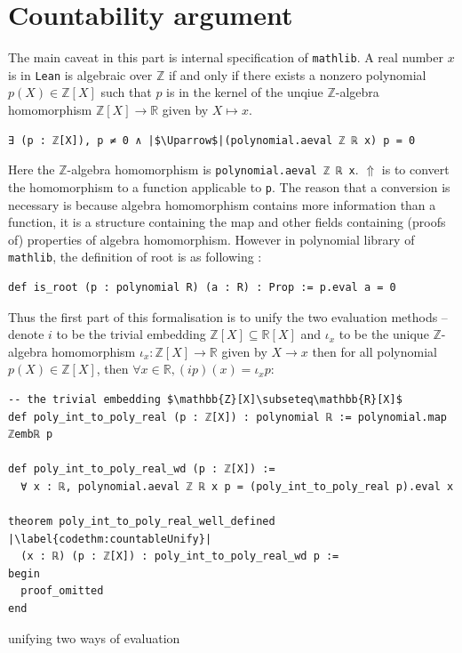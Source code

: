 \documentclass{report}
\theoremstyle{definition}
\newenvironment{code}{\captionsetup{type=listing}}{}
\begin{document}
\section{Countability argument}\label{fmlsn:count}
The main caveat in this part is internal specification of {\tt \small mathlib}. 
A real number $x$ is in {\tt \small Lean} is algebraic over $\mathbb Z$ if and only if there exists a nonzero polynomial $p(X)\in\mathbb Z[X]$ such that $p$ is in the kernel of the unqiue $\mathbb Z$-algebra homomorphism $\mathbb Z[X]\to\mathbb R$ given by $X\mapsto x$.
\begin{verbatim}
∃ (p : ℤ[X]), p ≠ 0 ∧ |$\Uparrow$|(polynomial.aeval ℤ ℝ x) p = 0
\end{verbatim}
Here the $\mathbb Z$-algebra homomorphism is {\tt \small polynomial.aeval ℤ ℝ x}. $\Uparrow$ is to convert the homomorphism to a function applicable to {\tt \small p}. The reason that a conversion is necessary is because algebra homomorphism contains more information than a function, it is a structure containing the map and other fields containing (proofs of) properties of algebra homomorphism.
However in polynomial library of {\tt \small mathlib}, the definition of root is as following :

\begin{verbatim}
def is_root (p : polynomial R) (a : R) : Prop := p.eval a = 0
\end{verbatim}

Thus the first part of this formalisation is to unify the two evaluation methods -- denote $i$ to be the trivial embedding $\mathbb Z[X]\subseteq\mathbb R[X]$ and $\iota_x$ to be the unique $\mathbb Z$-algebra homomorphism $\iota_x : \mathbb Z[X]\to\mathbb R$ given by $X\to x$ then for all polynomial $p(X)\in\mathbb Z[X]$, then $\forall x\in\mathbb R,(i p)(x) = \iota_x p$:

\begin{code}
\begin{verbatim}
-- the trivial embedding $\mathbb{Z}[X]\subseteq\mathbb{R}[X]$
def poly_int_to_poly_real (p : ℤ[X]) : polynomial ℝ := polynomial.map ℤembℝ p
    
def poly_int_to_poly_real_wd (p : ℤ[X]) := 
  ∀ x : ℝ, polynomial.aeval ℤ ℝ x p = (poly_int_to_poly_real p).eval x
    
theorem poly_int_to_poly_real_well_defined |\label{codethm:countableUnify}|
  (x : ℝ) (p : ℤ[X]) : poly_int_to_poly_real_wd p :=
begin
  proof_omitted
end
\end{verbatim}
\caption{unifying two ways of evaluation}
\label{code:countableUnify}
\end{code}
\end{document}
